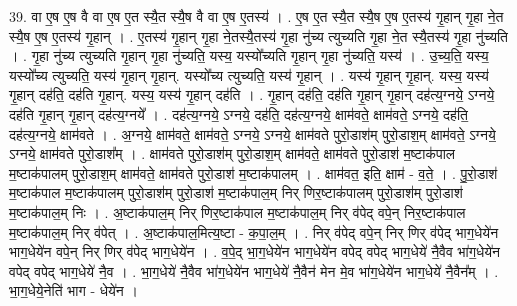 \documentclass[17pt]{extarticle}
\begin{document}
39. वा ए॒ष ए॒ष वै वा ए॒ष ए॒त स्यै॒त स्यै॒ष वै वा ए॒ष ए॒तस्य॑ । . ए॒ष ए॒त स्यै॒त स्यै॒ष ए॒ष ए॒तस्य॑ गृ॒हान् गृ॒हा ने॒त स्यै॒ष ए॒ष ए॒तस्य॑ गृ॒हान् । . ए॒तस्य॑ गृ॒हान् गृ॒हा ने॒तस्यै॒तस्य॑ गृ॒हा नु॑च्य त्युच्यति गृ॒हा ने॒त स्यै॒तस्य॑ गृ॒हा नु॑च्यति । . गृ॒हा नु॑च्य त्युच्यति गृ॒हान् गृ॒हा नु॑च्यति॒ यस्य॒ यस्यो᳚च्यति गृ॒हान् गृ॒हा नु॑च्यति॒ यस्य॑ । . उ॒च्य॒ति॒ यस्य॒ यस्यो᳚च्य त्युच्यति॒ यस्य॑ गृ॒हान् गृ॒हान्. यस्यो᳚च्य त्युच्यति॒ यस्य॑ गृ॒हान् । . यस्य॑ गृ॒हान् गृ॒हान्. यस्य॒ यस्य॑ गृ॒हान् दह॑ति॒ दह॑ति गृ॒हान्. यस्य॒ यस्य॑ गृ॒हान् दह॑ति । . गृ॒हान् दह॑ति॒ दह॑ति गृ॒हान् गृ॒हान् दह॑त्य॒ग्नये॒ ऽग्नये॒ दह॑ति गृ॒हान् गृ॒हान् दह॑त्य॒ग्नये᳚ । . दह॑त्य॒ग्नये॒ ऽग्नये॒ दह॑ति॒ दह॑त्य॒ग्नये॒ क्षाम॑वते॒ क्षाम॑वते॒ ऽग्नये॒ दह॑ति॒ दह॑त्य॒ग्नये॒ क्षाम॑वते । . अ॒ग्नये॒ क्षाम॑वते॒ क्षाम॑वते॒ ऽग्नये॒ ऽग्नये॒ क्षाम॑वते पुरो॒डाश॑म् पुरो॒डाश॒म् क्षाम॑वते॒ ऽग्नये॒ ऽग्नये॒ क्षाम॑वते पुरो॒डाश᳚म् । . क्षाम॑वते पुरो॒डाश॑म् पुरो॒डाश॒म् क्षाम॑वते॒ क्षाम॑वते पुरो॒डाश॑ म॒ष्टाक॑पाल म॒ष्टाक॑पालम् पुरो॒डाश॒म् क्षाम॑वते॒ क्षाम॑वते पुरो॒डाश॑ म॒ष्टाक॑पालम् । . क्षाम॑वत॒ इति॒ क्षाम॑ - व॒ते॒ । . पु॒रो॒डाश॑ म॒ष्टाक॑पाल म॒ष्टाक॑पालम् पुरो॒डाश॑म् पुरो॒डाश॑ म॒ष्टाक॑पाल॒म् निर् णिर॒ष्टाक॑पालम् पुरो॒डाश॑म् पुरो॒डाश॑ म॒ष्टाक॑पाल॒म् निः । . अ॒ष्टाक॑पाल॒म् निर् णिर॒ष्टाक॑पाल म॒ष्टाक॑पाल॒म् निर् व॑पेद् वपे॒न् निर॒ष्टाक॑पाल म॒ष्टाक॑पाल॒म् निर् व॑पेत् । . अ॒ष्टाक॑पाल॒मित्य॒ष्टा - क॒पा॒ल॒म् । . निर् व॑पेद् वपे॒न् निर् णिर् व॑पेद् भाग॒धेये॑न भाग॒धेये॑न वपे॒न् निर् णिर् व॑पेद् भाग॒धेये॑न । . व॒पे॒द् भा॒ग॒धेये॑न भाग॒धेये॑न वपेद् वपेद् भाग॒धेये॑ नै॒वैव भा॑ग॒धेये॑न वपेद् वपेद् भाग॒धेये॑ नै॒व । . भा॒ग॒धेये॑ नै॒वैव भा॑ग॒धेये॑न भाग॒धेये॑ नै॒वैन॑ मेन मे॒व भा॑ग॒धेये॑न भाग॒धेये॑ नै॒वैन᳚म् । . भा॒ग॒धेये॒नेति॑ भाग - धेये॑न । \newline
\end{document}
